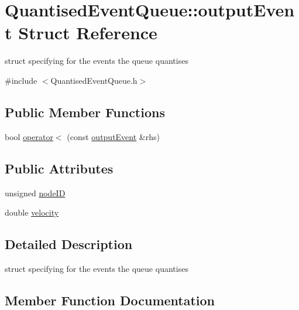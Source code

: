 \hypertarget{structQuantisedEventQueue_1_1outputEvent}{}\section{Quantised\+Event\+Queue\+:\+:output\+Event Struct Reference}
\label{structQuantisedEventQueue_1_1outputEvent}


struct specifying for the events the queue quantises  




{\ttfamily \#include $<$Quantised\+Event\+Queue.\+h$>$}

\subsection*{Public Member Functions}
\begin{DoxyCompactItemize}
\item 
bool \mbox{\hyperlink{structQuantisedEventQueue_1_1outputEvent_af78529e507856f3e6187d063ead41320}{operator$<$}} (const \mbox{\hyperlink{structQuantisedEventQueue_1_1outputEvent}{output\+Event}} \&rhs)
\end{DoxyCompactItemize}
\subsection*{Public Attributes}
\begin{DoxyCompactItemize}
\item 
unsigned \mbox{\hyperlink{structQuantisedEventQueue_1_1outputEvent_a217eea923c7d29c3818a078ad49523f1}{node\+ID}}
\item 
double \mbox{\hyperlink{structQuantisedEventQueue_1_1outputEvent_abcec0dd63fe3d2a68f070a7518096e39}{velocity}}
\end{DoxyCompactItemize}


\subsection{Detailed Description}
struct specifying for the events the queue quantises 

\subsection{Member Function Documentation}
\mbox{\label{structQuantisedEventQueue_1_1outputEvent_af78529e507856f3e6187d063ead41320}} 
